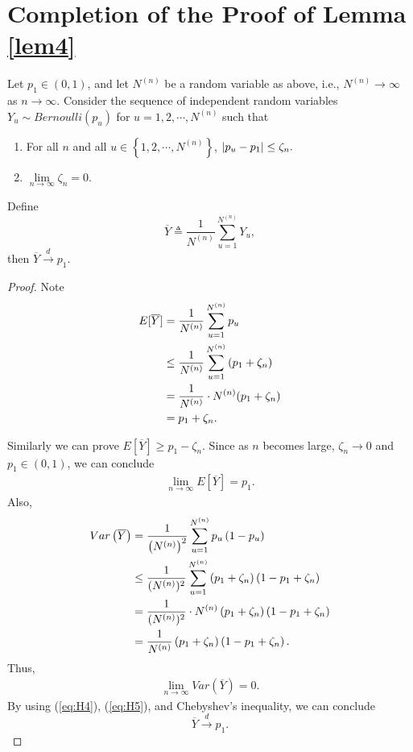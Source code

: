 \section{Completion of the Proof of Lemma \ref{lem4}}\label{sec:app_d}

Let $p_1 \in (0,1)$, and let $N^{(n)}$ be a random variable as above, i.e., $N^{(n)}  \rightarrow \infty$ as $n \rightarrow \infty$. Consider the sequence of independent random variables $Y_u \sim Bernoulli (p_u)$ for $u=1, 2, \cdots, N^{(n)}$ such that
\begin{enumerate}
	\item For all $n$ and all $u \in \left\{1, 2, \cdots, N^{(n)}\right\}$, $\abs*{p_u-p_1} \leq \zeta_n.$
	\item $\lim\limits_{n\to\infty} \zeta_n =0.$
\end{enumerate}
Define
\[\overline{Y}\triangleq \frac{1}{N^{(n)}}\sum_{u=1}^{N^{(n)}}Y_u,\]
then $\overline{Y} \xrightarrow{d} p_1.$

\begin{proof}
Note
\begin{align}
\no E[\overline{Y}] &= \frac{1}{N^{(n)}}\sum_{u=1}^{N^{(n)}}p_u\\
\nonumber &\leq \frac{1}{N^{(n)}} \sum_{u=1}^{N^{(n)}}\left(p_1+\zeta_n\right)\\
\nonumber &= \frac{1}{N^{(n)}}\cdot N^{(n)}(p_1+\zeta_n) \\
\nonumber &= p_1+\zeta_n. \ \
\end{align}

Similarly we can prove $E\left[\overline{Y}\right]\geq p_1-\zeta_n$. Since as $n$ becomes large, $\zeta_n\rightarrow 0$ and $p_1 \in (0,1)$, we can conclude
\begin{align}\label{eq:H4}
\lim\limits_{n\to\infty} E\left[\overline{Y}\right]=p_1.
\end{align}
Also,
\begin{align}
	\no Var\left(\overline{Y}\right) &= \frac{1}{\left(N^{(n)}\right)^2}\sum_{u=1}^{N^{(n)}}p_u\left(1-p_u\right) \\
	\nonumber &\leq \frac{1}{(N^{(n)})^2} \sum_{u=1}^{N^{(n)}}\left(p_1+\zeta_n\right)\left(1-p_1+\zeta_n\right)\\
	\nonumber &= \frac{1}{(N^{(n)})^2}\cdot N^{(n)}\left(p_1+\zeta_n\right)\left(1-p_1+\zeta_n\right) \\
	\nonumber &= \frac{1}{N^{(n)}} \left(p_1+\zeta_n\right)\left(1-p_1+\zeta_n\right). \ \
\end{align}
Thus,
\begin{align}\label{eq:H5}
\lim_{n\to\infty} Var\left(\overline{Y}\right)=0.
\end{align}
By using (\ref{eq:H4}), (\ref{eq:H5}), and Chebyshev's inequality, we can conclude
\[\overline{Y}\xrightarrow{d} p_1.\]

\end{proof}
